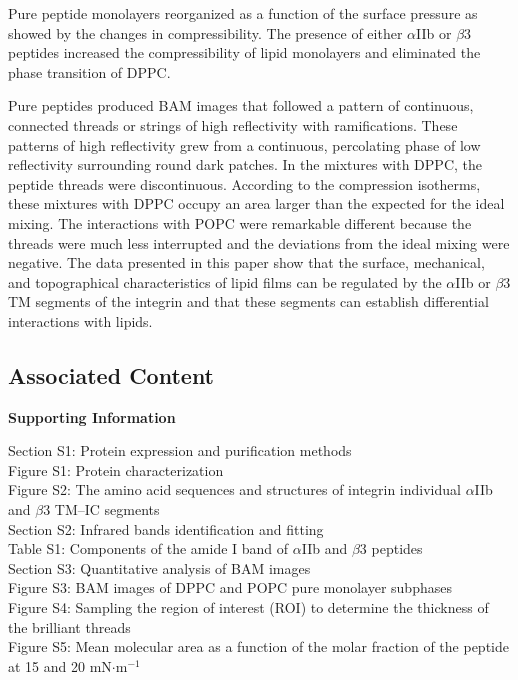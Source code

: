 \documentclass[journal=jacsat,manuscript=article]{achemso}
\begin{document}
Pure peptide monolayers reorganized as a function of the surface pressure as showed by the changes in compressibility. The presence of either $\alpha$IIb or $\beta$3 peptides increased the compressibility of lipid monolayers and eliminated the phase transition of DPPC.

Pure peptides produced BAM images that followed a pattern of continuous, connected threads or strings of high reflectivity with ramifications. These patterns of high reflectivity grew from a continuous, percolating phase of low reflectivity surrounding round dark patches. In the mixtures with DPPC, the peptide threads were discontinuous. According to the compression isotherms, these mixtures with DPPC occupy an area larger than the expected for the ideal mixing. The interactions with POPC were remarkable different because the threads were much less interrupted and the deviations from the ideal mixing were negative. The data presented in this paper show that the surface, mechanical, and topographical characteristics of lipid films can be regulated by the $\alpha$IIb or $\beta$3 TM segments of the integrin and that these segments can establish differential interactions with lipids.


\subsection*{Associated Content}\label{sec:support}
\textbf{Supporting Information}

\noindent Section S1: Protein expression and purification methods\\
Figure S1: Protein characterization \\
Figure S2: The amino acid sequences and structures of integrin individual $\alpha$IIb and $\beta$3 TM–IC segments\\
Section S2: Infrared bands identification and fitting\\
Table S1: Components of the amide I band of $\alpha$IIb and $\beta$3 peptides \\
Section S3: Quantitative analysis of BAM images\\
Figure S3: BAM images of DPPC and POPC pure monolayer subphases\\
Figure S4: Sampling the region of interest (ROI) to determine the thickness of the brilliant threads\\
Figure S5: Mean molecular area as a function of the molar fraction of the peptide at 15 and 20 mN$\cdot$m$^{-1}$
\end{document}

